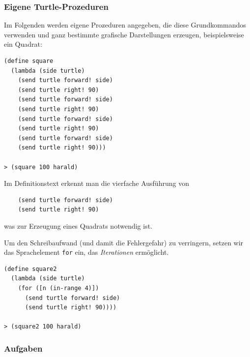 \documentclass[12pt,a4paper]{scrartcl}
\begin{document}
\subsubsection*{Eigene Turtle-Prozeduren}

Im Folgenden werden eigene Prozeduren angegeben, die diese Grundkommandos verwenden und ganz bestimmte grafische Darstellungen erzeugen, beispielsweise ein Quadrat:

\begin{verbatim}
(define square
  (lambda (side turtle)
    (send turtle forward! side)
    (send turtle right! 90)
    (send turtle forward! side)
    (send turtle right! 90)
    (send turtle forward! side)
    (send turtle right! 90)
    (send turtle forward! side)
    (send turtle right! 90)))

> (square 100 harald)
\end{verbatim}

Im Definitionstext erkennt man die vierfache Ausführung von
\begin{verbatim}
    (send turtle forward! side)
    (send turtle right! 90)
\end{verbatim}
was zur Erzeugung eines Quadrats notwendig ist.

Um den Schreibaufwand (und damit die Fehlergefahr) zu verringern, setzen wir das Sprachelement \texttt{for} ein, das \textit{Iterationen} ermöglicht.
\begin{verbatim}
(define square2
  (lambda (side turtle)
    (for ([n (in-range 4)])
      (send turtle forward! side)
      (send turtle right! 90))))

> (square2 100 harald)
\end{verbatim}


%
%
%

\subsubsection*{Aufgaben}
\end{document}
